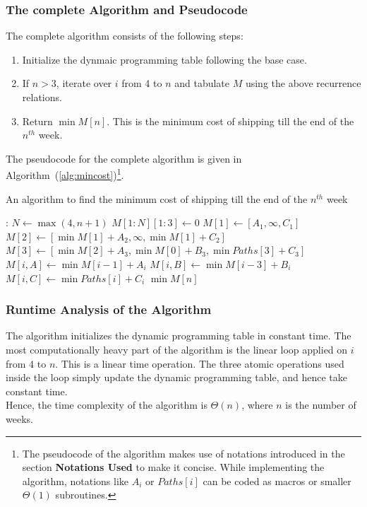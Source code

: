 \documentclass[12pt]{report}
\begin{document}
    \subsubsection*{The complete Algorithm and Pseudocode}
    The complete algorithm consists of the following steps:
    \begin{enumerate}
        \item Initialize the dynmaic programming table following the base case.
        \item If $n > 3$, iterate over $i$ from 4 to $n$ and tabulate $M$ using the above recurrence relations.
        \item Return $\min{M[n]}$. This is the minimum cost of shipping till the end of the $n^{th}$ week.
    \end{enumerate}
    The pseudocode for the complete algorithm is given in Algorithm~(\ref{alg:mincost})\footnote{
        The pseudocode of the algorithm makes use of notations introduced in the section \textbf{Notations Used} to make it concise.
        While implementing the algorithm, notations like $A_{i}$ or $Paths[i]$ can be coded as macros or smaller $\Theta(1)$ subroutines.
    }.

    \begin{algorithm}
        \caption{An algorithm to find the minimum cost of shipping till the end of the $n^{th}$ week}
        \label{alg:mincost}
        \begin{algorithmic}[1]
            :
                \State $N \gets \max{(4, n+1)}$
                \State $M[1:N][1:3] \gets 0$
                \State $M[1] \gets [A_{1}, \infty, C_{1}]$
                \State $M[2] \gets [\min{M[1]} + A_{2}, \infty, \min{M[1]} + C_{2}]$
                \State $M[3] \gets [\min{M[2]} + A_{3}, \min{M[0]} + B_{3}, \min{Paths[3]} + C_{3}]$
                        \State $M[i, A] \gets \min{M[i-1]} + A_{i}$
                        \State $M[i, B] \gets \min{M[i-3]} + B_{i}$
                        \State $M[i, C] \gets \min{Paths[i]} + C_{i}$
                    \EndFor
                \EndIf
                \State \Return $\min{M[n]}$
            \EndProcedure
        \end{algorithmic}
    \end{algorithm}

    \subsubsection*{Runtime Analysis of the Algorithm}
    The algorithm initializes the dynamic programming table in constant time.
    The most computationally heavy part of the algorithm is the linear loop applied on $i$ from 4 to $n$.
    This is a linear time operation.
    The three atomic operations used inside the loop simply update the dynamic programming table, and hence take constant time.
    \vspace*{10pt} \\
    Hence, the time complexity of the algorithm is $\Theta(n)$, where $n$ is the number of weeks.
    \vfill
    \pagebreak
\end{document}
